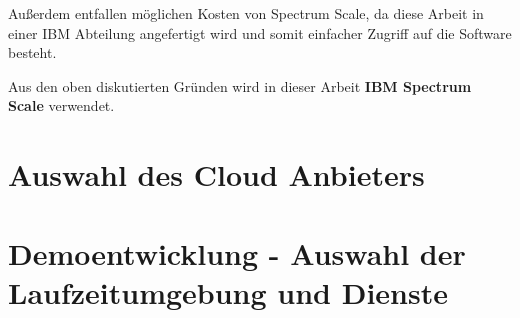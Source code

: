 Außerdem entfallen möglichen Kosten von Spectrum Scale, da diese Arbeit in einer IBM Abteilung angefertigt wird und somit einfacher Zugriff auf die Software besteht.

Aus den oben diskutierten Gründen wird in dieser Arbeit \textbf{IBM Spectrum Scale} verwendet.

\section{Auswahl des Cloud Anbieters}
\section{Demoentwicklung - Auswahl der Laufzeitumgebung und Dienste}